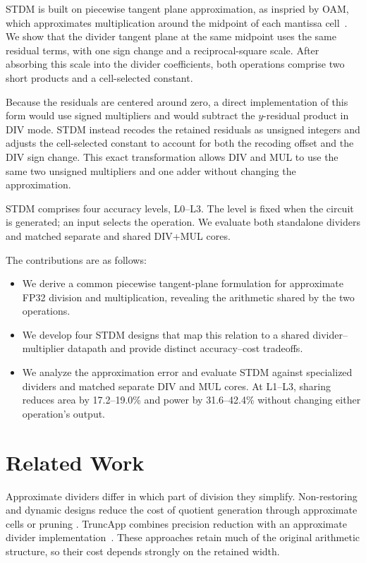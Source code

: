 \documentclass[conference]{IEEEtran}
\begin{document}
STDM is built on piecewise tangent plane approximation, as inspried by OAM, which approximates multiplication around the midpoint of each mantissa cell~\cite{chen2020oam}. We show that the
divider tangent plane at the same midpoint uses the same residual terms,
with one sign change and a reciprocal-square scale. After absorbing this scale
into the divider coefficients, both operations comprise two short products and a cell-selected constant.

Because the residuals are centered around zero, a direct implementation of
this form would use signed multipliers and would subtract the $y$-residual
product in DIV mode. STDM instead recodes the retained residuals as unsigned
integers and adjusts the cell-selected constant to account for both the
recoding offset and the DIV sign change. This exact transformation allows DIV
and MUL to use the same two unsigned multipliers and one adder without changing
the approximation.

STDM comprises four accuracy levels, L0--L3. The level is fixed when the circuit
is generated; an input selects the operation. We evaluate both standalone
dividers and matched separate and shared DIV+MUL cores.

The contributions are as follows:
\begin{itemize}
  \setlength{\itemsep}{0pt}
  \setlength{\parskip}{0pt}
  \setlength{\parsep}{0pt}
  \item We derive a common piecewise tangent-plane formulation for approximate
  FP32 division and multiplication, revealing the arithmetic shared by the two
  operations.
  \item We develop four STDM designs that map this relation to a shared
  divider--multiplier datapath and provide distinct accuracy--cost tradeoffs.
  \item We analyze the approximation error and evaluate STDM against
  specialized dividers and matched separate DIV and MUL cores. At L1--L3,
  sharing reduces area by 17.2--19.0\% and power by 31.6--42.4\% without
  changing either operation's output.
\end{itemize}

\section{Related Work}
Approximate dividers differ in which part of division they simplify.
Non-restoring and dynamic designs reduce the cost of quotient generation
through approximate cells or pruning
\cite{chen2015nonrestoring,hashemi2016dynamic}.
TruncApp combines precision reduction with an approximate divider
implementation~\cite{vahdat2017truncapp}. These approaches retain much of
the original arithmetic structure, so their cost depends strongly on the
retained width.
\end{document}
